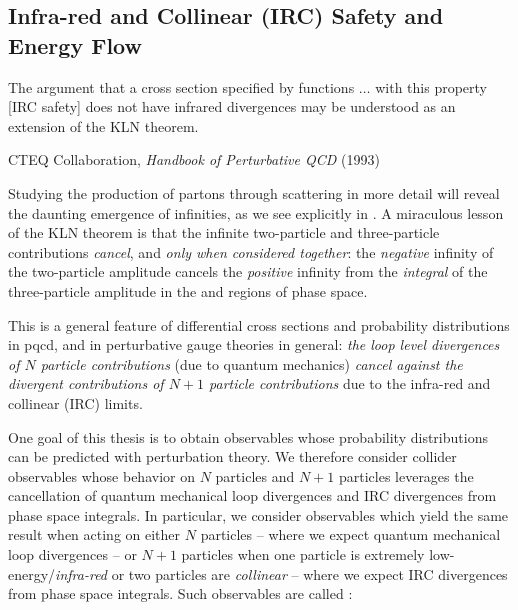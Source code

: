 


\subsection{Infra-red and Collinear (IRC) Safety and Energy Flow}
\label{sec:irc-safety}

\epigraph{
    The argument that a cross section specified by functions \(\dots\) with this property [IRC safety] does not have infrared divergences may be understood as an extension of the KLN theorem.
}{
    CTEQ Collaboration,
    \textit{Handbook of Perturbative QCD} (1993)
}

Studying the production of partons through scattering in more detail will reveal the daunting emergence of infinities, as we see explicitly in .
%
A miraculous lesson of the KLN theorem is that the infinite two-particle and three-particle contributions \emph{cancel}, and \emph{only when considered together}:
%
the \textit{negative} infinity of the two-particle amplitude cancels the \textit{positive} infinity from the \textit{integral} of the three-particle amplitude in the  and  regions of phase space.

This is a general feature of differential cross sections and probability distributions in \gls{pqcd}, and in perturbative gauge theories in general:
%
\textit{the loop level divergences of \(N\) particle contributions} (due to quantum mechanics) \textit{cancel against the divergent contributions of \(N+1\) particle contributions} due to the infra-red and collinear (IRC) limits.

One goal of this thesis is to obtain observables whose probability distributions can be predicted with perturbation theory.
%
We therefore consider collider observables whose behavior on \(N\) particles and \(N+1\) particles leverages the cancellation of quantum mechanical loop divergences and IRC divergences from phase space integrals.
%
In particular, we consider observables which yield the same result when acting on either \(N\) particles -- where we expect quantum mechanical loop divergences -- or \(N+1\) particles when one particle is extremely low-energy/\emph{infra-red} or two particles are \emph{collinear} -- where we expect IRC divergences from phase space integrals.
%
Such observables are called :


